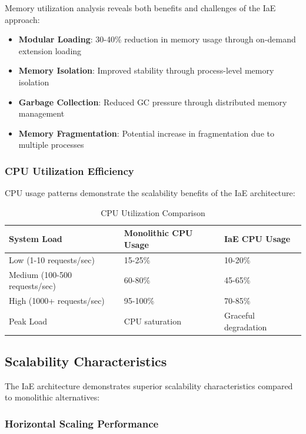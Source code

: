 Memory utilization analysis reveals both benefits and challenges of the IaE approach:

\begin{itemize}
    \item \textbf{Modular Loading}: 30-40\% reduction in memory usage through on-demand extension loading
    \item \textbf{Memory Isolation}: Improved stability through process-level memory isolation
    \item \textbf{Garbage Collection}: Reduced GC pressure through distributed memory management
    \item \textbf{Memory Fragmentation}: Potential increase in fragmentation due to multiple processes
\end{itemize}

\subsubsection{CPU Utilization Efficiency}

CPU usage patterns demonstrate the scalability benefits of the IaE architecture:

\begin{table}[ht]
\centering
\begin{tabular}{@{}lll@{}}
\toprule
\textbf{System Load} & \textbf{Monolithic CPU Usage} & \textbf{IaE CPU Usage} \\
\midrule
Low (1-10 requests/sec) & 15-25\% & 10-20\% \\
Medium (100-500 requests/sec) & 60-80\% & 45-65\% \\
High (1000+ requests/sec) & 95-100\% & 70-85\% \\
Peak Load & CPU saturation & Graceful degradation \\
\bottomrule
\end{tabular}
\caption{CPU Utilization Comparison}
\label{tab:cpu-utilization}
\end{table}

\subsection{Scalability Characteristics}

The IaE architecture demonstrates superior scalability characteristics compared to monolithic alternatives:

\subsubsection{Horizontal Scaling Performance}

